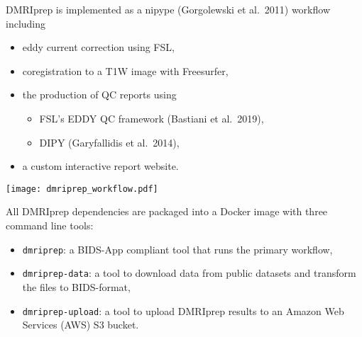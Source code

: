 \documentclass[a0, landscape]{a0poster}
\newenvironment{Figure}
  {\par\medskip\noindent\minipage{\linewidth}}
  {\endminipage\par\medskip}
\begin{document}
\begin{multicols}{3}
\noindent DMRIprep is implemented as a nipype (Gorgolewski et al.~2011) workflow including
\begin{itemize}
    \item eddy current correction using FSL,
    \item coregistration to a T1W image with Freesurfer,
    \item the production of QC reports using
        \begin{itemize}
            \item FSL's EDDY QC framework (Bastiani et al.~2019),
            \item DIPY (Garyfallidis et al.~2014),
        \end{itemize}
    \item a custom interactive report website.
\end{itemize}

\begin{Figure}
    \centering
    \texttt{[image: dmriprep\_workflow.pdf]}
\end{Figure}

\vfill
\columnbreak

\noindent All DMRIprep dependencies are packaged into a Docker image with three command line tools:
\begin{itemize}
    \item \texttt{dmriprep}: a BIDS-App compliant tool that runs the primary workflow,
    \item \texttt{dmriprep-data}: a tool to download data from public datasets and transform the files to BIDS-format,
    \item \texttt{dmriprep-upload}: a tool to upload DMRIprep results to an Amazon Web Services (AWS) S3 bucket.
\end{itemize}


\end{multicols}
\end{document}
